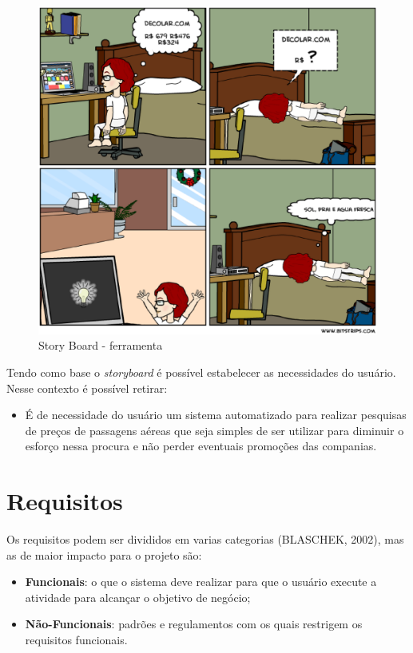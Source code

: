 \begin{figure}[h]
	\centering
	\label{fig02}
		\includegraphics[keepaspectratio=true,scale=0.5]{figuras/ferramenta.eps}
		\caption{Story Board - ferramenta}
\end{figure}

Tendo como base o \textit{storyboard} é possível estabelecer as necessidades do usuário. Nesse contexto é possível retirar:

\begin{itemize}
	\item É de necessidade do usuário um sistema automatizado para realizar pesquisas de preços de passagens aéreas que seja simples de ser utilizar para diminuir o esforço nessa procura e não perder eventuais promoções das companias.
\end{itemize}

\section{Requisitos}

Os requisitos podem ser divididos em varias categorias (BLASCHEK, 2002), mas as de maior impacto para o projeto são:
\begin{itemize}
	\item \textbf{Funcionais}: o que o sistema deve realizar para que o usuário execute a atividade para alcançar o objetivo de negócio;
	\item \textbf{Não-Funcionais}: padrões e regulamentos com os quais restrigem os requisitos funcionais.
\end{itemize}

